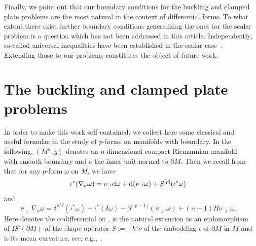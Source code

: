 \documentclass[10pt,a4paper]{amsart}
\numberwithin{equation}{section}
\theoremstyle{definition}
\begin{document}
Finally, we point out that our boundary conditions for the buckling and clamped plate problems are the most natural in the context of differential forms.
To what extent there exist further boundary conditions generalizing the ones for the scalar problem is a question which has not been addressed in this article.
Independently, so-called universal inequalities have been established in the scalar case~\cite{ChengYang2006,ChengYang2012,DuMaoWang2016}.
Extending those to our problems constitutes the object of future work.

\section{The buckling and clamped plate problems}

In order to make this work self-contained, we collect here some classical and useful formulae in the study of $p$-forms on manifolds with boundary. In the following, $(M^n,g)$ denotes an $n$-dimensional compact Riemannian manifold with smooth boundary and $\nu$ the inner unit normal to $\partial M$. Then we recall from~\cite[Lemma 18]{RaulotSavo2011} that for any $p$-form $\omega$ on $M$, we have
\begin{equation}\label{eq:iotastarnablanuomega}
\iota^*(\nabla_\nu\omega)=\nu\lrcorner\,{\rm d}\omega+{\rm d}(\nu\lrcorner\,\omega)+S^{[p]}(\iota^*\omega)
\end{equation}
and
\begin{equation}\label{eq:nuintnablanuomega}
\nu\lrcorner\,\nabla_\nu\omega = \delta^{\partial M}(\iota^*\omega)-\iota^*(\delta\omega)-S^{[p-1]}(\nu\lrcorner\,\omega)+(n-1)H\nu\lrcorner\,\omega.
\end{equation}
Here  denotes the codifferential on ,  is the natural extension as an endomorphism of $\Omega^{p}(\partial M)$ of the shape operator $S:=-\nabla\nu$ of the embedding $\iota$ of $\partial M$ in $M$ and  is its mean curvature, see, e.g.,~\cite[p.~624]{RaulotSavo2011}.
\end{document}
